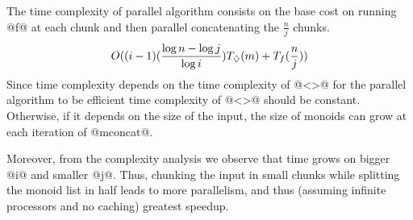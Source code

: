 The time complexity of parallel algorithm consists on the base cost on running @f@
at each chunk and then parallel concatenating the $\frac{n}{j}$ chunks.
\begin{equation}
O((i-1)(\frac{\log n - \log j}{\log i})T_{\diamondsuit}(m) + T_f(\frac{n}{j})) \label{eq:complexity}
\end{equation}
%
Since time complexity depends on the time complexity of @<>@
for the parallel algorithm to be efficient time complexity of @<>@ should be constant.
%
Otherwise, if it depends on the size of the input, the size of monoids can grow at each iteration of @mconcat@.
%

Moreover, from the complexity analysis we observe that time grows on bigger @i@ and smaller @j@.
%
Thus, chunking the input in small chunks while splitting the monoid list in half leads
to more parallelism, and thus (assuming infinite processors and no caching) greatest speedup.
